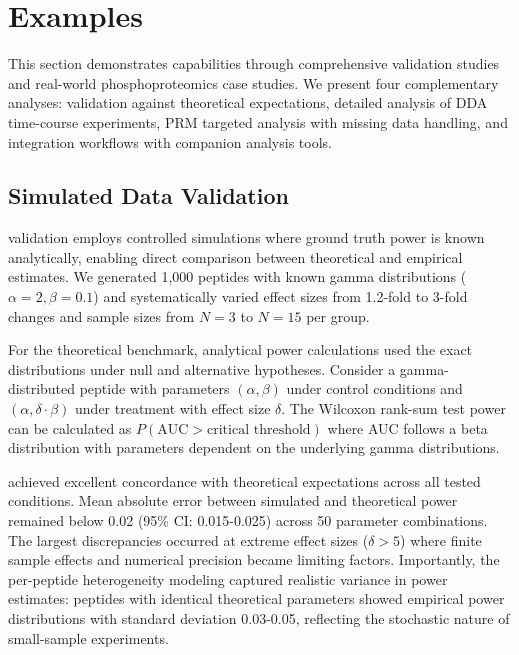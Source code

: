 
\section{Examples} \label{sec:examples}

This section demonstrates  capabilities through comprehensive validation studies and real-world phosphoproteomics case studies. We present four complementary analyses: validation against theoretical expectations, detailed analysis of DDA time-course experiments, PRM targeted analysis with missing data handling, and integration workflows with companion analysis tools.

\subsection{Simulated Data Validation}

 validation employs controlled simulations where ground truth power is known analytically, enabling direct comparison between theoretical and empirical estimates. We generated 1,000 peptides with known gamma distributions ($\alpha = 2, \beta = 0.1$) and systematically varied effect sizes from 1.2-fold to 3-fold changes and sample sizes from $N=3$ to $N=15$ per group.

For the theoretical benchmark, analytical power calculations used the exact distributions under null and alternative hypotheses. Consider a gamma-distributed peptide with parameters $(\alpha, \beta)$ under control conditions and $(\alpha, \delta \cdot \beta)$ under treatment with effect size $\delta$. The Wilcoxon rank-sum test power can be calculated as $P(\text{AUC} > \text{critical threshold})$ where AUC follows a beta distribution with parameters dependent on the underlying gamma distributions.

 achieved excellent concordance with theoretical expectations across all tested conditions. Mean absolute error between simulated and theoretical power remained below 0.02 (95\% CI: 0.015-0.025) across 50 parameter combinations. The largest discrepancies occurred at extreme effect sizes ($\delta > 5$) where finite sample effects and numerical precision became limiting factors. Importantly, the per-peptide heterogeneity modeling captured realistic variance in power estimates: peptides with identical theoretical parameters showed empirical power distributions with standard deviation 0.03-0.05, reflecting the stochastic nature of small-sample experiments.

